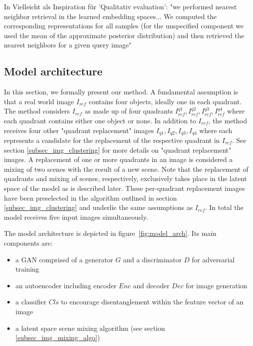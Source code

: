 \documentclass[12pt,a4paper]{article}
\begin{document}
\par In \cite{1611.03383} Vielleicht als Inspiration für 'Qualitativ evaluation': "we performed nearest neighbor retrieval in the learned embedding spaces... We computed the corresponding representations for all samples (for the unspecified component we used the mean of the approximate posterior distribution) and then retrieved the nearest neighbors for a given query image"


\subsection{Model architecture}
In this section, we formally present our method. A fundamental assumption is that a real world image $I_{ref}$ contains four objects, ideally one in each quadrant. The method considers $I_{ref}$ as made up of four quadrants $I^{q1}_{ref}, I^{q2}_{ref}, I^{q3}_{ref}, I^{q4}_{ref}$ where each quadrant contains either one object or none. In addition to $I_{ref}$, the method receives four other "quadrant replacement" images $I_{q1},I_{q2},I_{q3},I_{q4}$ where each represents a candidate for the replacement of the respective quadrant in $I_{ref}$. See section \ref{subsec_img_clustering} for more details on "quadrant replacement" images. A replacement of one or more quadrants in an image is considered a mixing of two scenes with the result of a new scene. Note that the replacement of quadrants and mixing of scenes, respectively, exclusively takes place in the latent space of the model as is described later. These per-quadrant replacement images have been preselected in the algorithm outlined in section \ref{subsec_img_clustering} and underlie the same assumptions as $I_{ref}$. In total the model receives five input images simultaneously.

The model architecture is depicted in figure~\ref{fig:model_arch}. Its main components are:

\begin{itemize}
   \item a GAN comprised of a generator $G$ and a discriminator $D$ for adversarial training
   \item an autoencoder including encoder $Enc$ and decoder $Dec$ for image generation
   \item a classifier $Cls$ to encourage disentanglement within the feature vector of an image
   \item a latent space scene mixing algorithm (see section \ref{subsec_img_mixing_algo})
\end{itemize}
 
\end{document}
